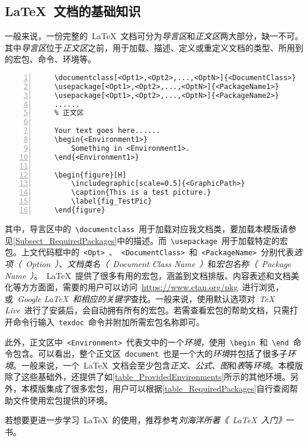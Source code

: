 \subsection{\LaTeX~文档的基础知识}
\label{Subsect_LaTeXBasics}
一般来说，一份完整的~\LaTeX~文档可分为\emph{导言区}和\emph{正文区}两大部分，缺一不可。其中\emph{导言区}位于\emph{正文区}之前，用于加载、描述、定义或重定义文档的类型、所用到的宏包、命令、环境等。
\begin{Verbatim}[gobble=1,frame=single,numbers=left]
	% 导言区
	\documentclass[<Opt1>,<Opt2>,...,<OptN>]{<DocumentClass>}
	\usepackage[<Opt1>,<Opt2>,...,<OptN>]{<PackageName1>}
	\usepackage[<Opt1>,<Opt2>,...,<OptN>]{<PackageName2>}
	......
	% 正文区
	
	Your text goes here......
	\begin{<Environment1>}
		Something in <Environment1>.
	\end{<Environment1>}

	\begin{figure}[H]
		\includegraphic[scale=0.5]{<GraphicPath>}
		\caption{This is a test picture.}
		\label{fig_TestPic}
	\end{figure}

\end{Verbatim}


其中，导言区中的~\verb|\documentclass|~用于加载对应我文档类，要加载本模版请参见\cref{Subsect_RequiredPackages}中的描述。而~\verb|\usepackage|~用于加载特定的宏包。上文代码框中的~\verb|<Opt>|~、~\verb|<DocumentClass>|~和~\verb|<PackageName>|~分别代表\emph{选项（~Option~）}、\emph{文档类名（~Document Class Name~）}和\emph{宏包名称（~Package Name~）}。~\LaTeX~提供了很多有用的宏包，涵盖到文档排版、内容表述和文档美化等方方面面，需要的用户可以访问~\url{https://www.ctan.org/pkg}~进行浏览，或\emph{~Google LaTeX~和相应的关键字}查找。一般来说，使用默认选项对~\emph{TeX Live}~进行了安装后，会自动拥有所有的宏包。若需查看宏包的帮助文档，只需打开命令行输入~\verb|texdoc|~命令并附加所需宏包名称即可。


此外，正文区中~\verb|<Environment>|~代表文中的一个\emph{环境}，使用~\verb|\begin|~和~\verb|\end|~命令包含。可以看出，整个正文区~\verb|document|~也是一个大的\emph{环境}并包括了很多子\emph{环境}。一般来说，一个~\LaTeX~文档会至少包含\emph{正文}、\emph{公式}、\emph{图}和\emph{表}等\emph{环境}。本模版除了这些基础外，还提供了如\cref{table_ProvidedEnvironments}所示的其他环境。另外，本模版集成了很多宏包，用户可以根据\cref{table_RequiredPackages}自行查阅帮助文件使用宏包提供的环境。


若想要更进一步学习~\LaTeX~的使用，推荐参考\emph{刘海洋所著《~\LaTeX~入门》}一书\cite{Book_LaTeXIntro}。

